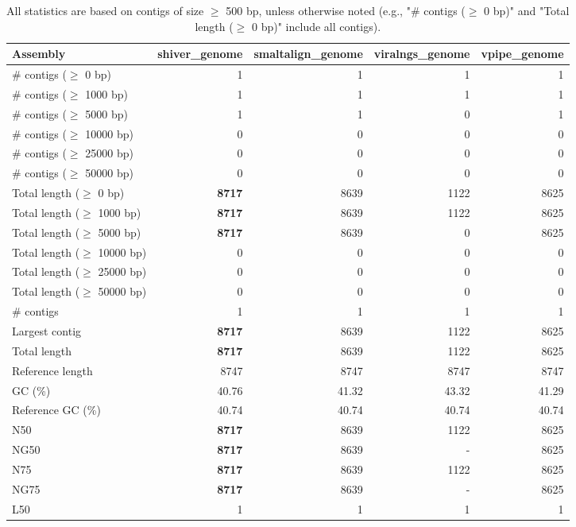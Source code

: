 \documentclass[12pt,a4paper]{article}
\begin{document}
\begin{table}[ht]
\begin{center}
\caption{All statistics are based on contigs of size $\geq$ 500 bp, unless otherwise noted (e.g., "\# contigs ($\geq$ 0 bp)" and "Total length ($\geq$ 0 bp)" include all contigs).}
\begin{tabular}{|l*{4}{|r}|}
\hline
Assembly & shiver\_genome & smaltalign\_genome & viralngs\_genome & vpipe\_genome \\ \hline
\# contigs ($\geq$ 0 bp) & 1 & 1 & 1 & 1 \\ \hline
\# contigs ($\geq$ 1000 bp) & 1 & 1 & 1 & 1 \\ \hline
\# contigs ($\geq$ 5000 bp) & 1 & 1 & 0 & 1 \\ \hline
\# contigs ($\geq$ 10000 bp) & 0 & 0 & 0 & 0 \\ \hline
\# contigs ($\geq$ 25000 bp) & 0 & 0 & 0 & 0 \\ \hline
\# contigs ($\geq$ 50000 bp) & 0 & 0 & 0 & 0 \\ \hline
Total length ($\geq$ 0 bp) & {\bf 8717} & 8639 & 1122 & 8625 \\ \hline
Total length ($\geq$ 1000 bp) & {\bf 8717} & 8639 & 1122 & 8625 \\ \hline
Total length ($\geq$ 5000 bp) & {\bf 8717} & 8639 & 0 & 8625 \\ \hline
Total length ($\geq$ 10000 bp) & 0 & 0 & 0 & 0 \\ \hline
Total length ($\geq$ 25000 bp) & 0 & 0 & 0 & 0 \\ \hline
Total length ($\geq$ 50000 bp) & 0 & 0 & 0 & 0 \\ \hline
\# contigs & 1 & 1 & 1 & 1 \\ \hline
Largest contig & {\bf 8717} & 8639 & 1122 & 8625 \\ \hline
Total length & {\bf 8717} & 8639 & 1122 & 8625 \\ \hline
Reference length & 8747 & 8747 & 8747 & 8747 \\ \hline
GC (\%) & 40.76 & 41.32 & 43.32 & 41.29 \\ \hline
Reference GC (\%) & 40.74 & 40.74 & 40.74 & 40.74 \\ \hline
N50 & {\bf 8717} & 8639 & 1122 & 8625 \\ \hline
NG50 & {\bf 8717} & 8639 & - & 8625 \\ \hline
N75 & {\bf 8717} & 8639 & 1122 & 8625 \\ \hline
NG75 & {\bf 8717} & 8639 & - & 8625 \\ \hline
L50 & 1 & 1 & 1 & 1 \\ \hline

\end{tabular}
\end{center}
\end{table}
\end{document}
